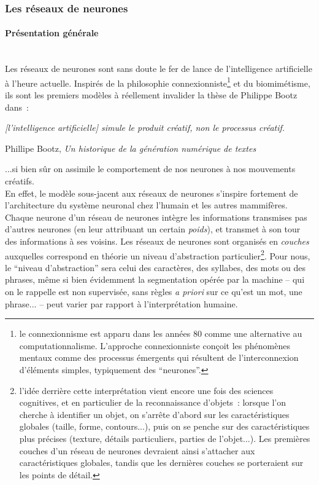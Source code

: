 \documentclass{article}
\newcommand{\subsubsubsection}[1]{\paragraph{#1}\mbox{}\\}
\newenvironment{citationbox}
{\begin{center}
		\begin{minipage}{.8\textwidth}
		}
		{
		\end{minipage}	
\end{center}
}
\begin{document}
			\subsubsection{Les réseaux de neurones}\label{neural_net}
				\subsubsubsection{Présentation générale}
					Les réseaux de neurones sont sans doute le fer de lance de l'intelligence artificielle à l'heure actuelle. Inspirés de la philosophie connexionniste\footnote{le connexionnisme est apparu dans les années 80 comme une alternative au computationnalisme. L'approche connexionniste conçoit les phénomènes mentaux comme des processus émergents qui résultent de l'interconnexion d'éléments simples, typiquement des ``neurones''.} et du biomimétisme, ils sont les premiers modèles à réellement invalider la thèse de Philippe Bootz dans~:
					\begin{citationbox}
						\textit{[l'intelligence artificielle] simule le produit créatif, non le processus créatif.}
						\begin{flushright}
							Phillipe Bootz, \textit{Un historique de la génération numérique de textes} \cite{bootz2006}
						\end{flushright}
					\end{citationbox}
					...si bien sûr on assimile le comportement de nos neurones à nos mouvements créatifs.\\
					En effet, le modèle sous-jacent aux réseaux de neurones s'inspire fortement de l'architecture du système neuronal chez l'humain et les autres mammifères. Chaque neurone d'un réseau de neurones intègre les informations transmises pas d'autres neurones (en leur attribuant un certain \textit{poids}), et transmet à son tour des informations à ses voisins. Les réseaux de neurones sont organisés en \textit{couches} auxquelles correspond en théorie un niveau d'abstraction particulier\footnote{l'idée derrière cette interprétation vient encore une fois des sciences cognitives, et en particulier de la reconnaissance d'objets~: lorsque l'on cherche à identifier un objet, on s'arrête d'abord sur les caractéristiques globales (taille, forme, contours...), puis on se penche sur des caractéristiques plus précises (texture, détails particuliers, parties de l'objet...). Les premières couches d'un réseau de neurones devraient ainsi s'attacher aux caractéristiques globales, tandis que les dernières couches se porteraient sur les points de détail.}. Pour nous, le ``niveau d'abstraction'' sera celui des caractères, des syllabes, des mots ou des phrases, même si bien évidemment la segmentation opérée par la machine -- qui on le rappelle est non supervisée, sans règles \textit{a priori} sur ce qu'est un mot, une phrase... -- peut varier par rapport à l'interprétation humaine.
\end{document}

